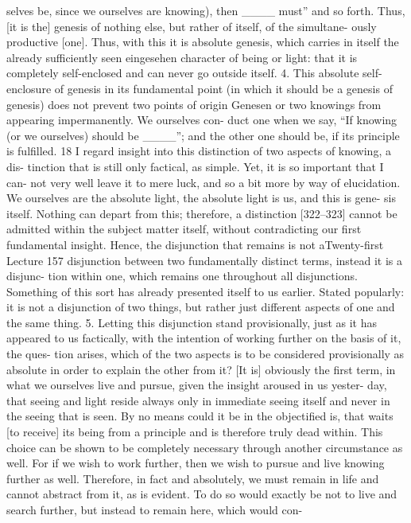 selves be, since we ourselves are knowing), then ____ must” and so forth.
Thus, [it is the] genesis of nothing else, but rather of itself, of the simultane-
ously productive [one]. Thus, with this it is absolute genesis, which carries in
itself the already sufficiently seen {eingesehen} character of being or light: that
it is completely self-enclosed and can never go outside itself.
4. This absolute self-enclosure of genesis in its fundamental point (in
which it should be a genesis of genesis) does not prevent two points of origin
{Genesen} or two knowings from appearing impermanently. We ourselves con-
duct one when we say, “If knowing (or we ourselves) should be ____”; and the
other one should be, if its principle is fulfilled. 18
I regard insight into this distinction of two aspects of knowing, a dis-
tinction that is still only factical, as simple. Yet, it is so important that I can-
not very well leave it to mere luck, and so a bit more by way of elucidation.
We ourselves are the absolute light, the absolute light is us, and this is gene-
sis itself. Nothing can depart from this; therefore, a distinction [322–323]
cannot be admitted within the subject matter itself, without contradicting
our first fundamental insight. Hence, the disjunction that remains is not aTwenty-first Lecture
157
disjunction between two fundamentally distinct terms, instead it is a disjunc-
tion within one, which remains one throughout all disjunctions. Something
of this sort has already presented itself to us earlier. Stated popularly: it is not
a disjunction of two things, but rather just different aspects of one and the
same thing.
5. Letting this disjunction stand provisionally, just as it has appeared to
us factically, with the intention of working further on the basis of it, the ques-
tion arises, which of the two aspects is to be considered provisionally as
absolute in order to explain the other from it? [It is] obviously the first term,
in what we ourselves live and pursue, given the insight aroused in us yester-
day, that seeing and light reside always only in immediate seeing itself and
never in the seeing that is seen. By no means could it be in the objectified is,
that waits [to receive] its being from a principle and is therefore truly dead
within. This choice can be shown to be completely necessary through another
circumstance as well. For if we wish to work further, then we wish to pursue
and live knowing further as well. Therefore, in fact and absolutely, we must
remain in life and cannot abstract from it, as is evident. To do so would exactly
be not to live and search further, but instead to remain here, which would con-
